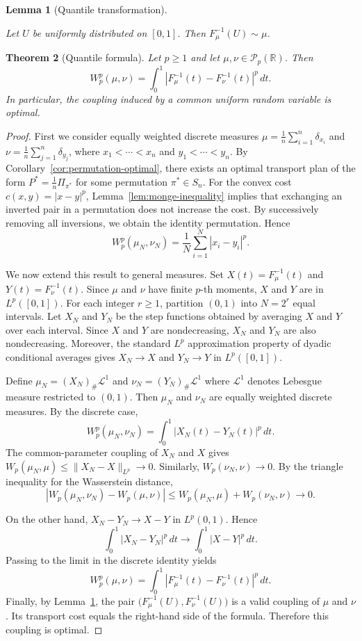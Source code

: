 \documentclass[11pt,a4paper]{article}
\newtheorem{theorem}{Theorem}[section]
\newtheorem{lemma}[theorem]{Lemma}
\theoremstyle{definition}
\begin{document}
\begin{lemma}[Quantile transformation]
    \label{lem:quantile-transform}

    Let $U$ be uniformly distributed on $[0,1]$. Then $F_\mu^{-1}(U)\sim\mu$.
\end{lemma}

\begin{theorem}[Quantile formula]
\label{thm:quantile-formula}
Let $p\geq1$ and let $\mu,\nu\in\mathcal{P}_p(\mathbb{R})$.
Then
\[
W_p^p(\mu,\nu)=\int_0^1\left|F_\mu^{-1}(t)-F_\nu^{-1}(t)\right|^p\,dt.
\]
In particular, the coupling induced by a common uniform random variable is optimal.
\end{theorem}

\begin{proof}
    First we consider equally weighted discrete measures $\mu=\frac{1}{n}\sum_{i=1}^n\delta_{x_i}$
    and $\nu=\frac{1}{n}\sum_{j=1}^n\delta_{y_j}$, where $x_1<\cdots<x_n$ and $y_1<\cdots<y_n$.
    By Corollary~\ref{cor:permutation-optimal}, there exists an optimal transport plan
    of the form $P^*=\frac{1}{n}\Pi_{\pi^*}$ for some permutation $\pi^*\in S_n$. For the
    convex cost $c(x,y)=|x-y|^p$, Lemma~\ref{lem:monge-inequality} implies that exchanging
    an inverted pair in a permutation does not increase the cost. By successively removing
    all inversions, we obtain the identity permutation. Hence
    \[W^p_p(\mu_N,\nu_N)=\frac{1}{N}\sum_{i=1}^N|x_i-y_i|^p.\]

    We now extend this result to general measures. Set $X(t)=F_\mu^{-1}(t)$ and $Y(t)=F_\nu^{-1}(t)$. Since
    $\mu$ and $\nu$ have finite $p$-th moments, $X$ and $Y$ are in $L^p([0,1])$. For each integer
    $r\geq1$, partition $(0,1)$ into $N=2^r$ equal intervals. Let $X_N$ and $Y_N$ be the step
    functions obtained by averaging $X$ and $Y$ over each interval. Since $X$ and $Y$ are nondecreasing,
    $X_N$ and $Y_N$ are also nondecreasing. Moreover, the standard $L^p$ approximation property of dyadic
    conditional averages gives $X_N\to X$ and $Y_N\to Y$ in $L^p([0,1])$.

    Define $\mu_N=(X_N)_\#\mathcal{L}^1$ and $\nu_N=(Y_N)_\#\mathcal{L}^1$ where $\mathcal{L}^1$ denotes
    Lebesgue measure restricted to $(0,1)$. Then $\mu_N$ and $\nu_N$ are equally weighted discrete measures.
    By the discrete case,
    \[W_p^p(\mu_N,\nu_N)=\int_0^1|X_N(t)-Y_N(t)|^p\,dt.\]
    The common-parameter coupling of $X_N$ and $X$ gives $W_p(\mu_N,\mu)\leq\|X_N-X\|_{L^p}\longrightarrow0$.
    Similarly, $W_p(\nu_N,\nu)\longrightarrow0$. By the triangle inequality for the Wasserstein distance,
    \[|W_p(\mu_N,\nu_N)-W_p(\mu,\nu)|\leq W_p(\mu_N,\mu)+W_p(\nu_N,\nu)\longrightarrow0.\]

    On the other hand,  $X_N-Y_N\to X-Y$ in $L^p(0,1)$. Hence
    \[
    \int_0^1|X_N-Y_N|^p\,dt
    \longrightarrow
    \int_0^1|X-Y|^p\,dt.
    \]
    Passing to the limit in the discrete identity yields
    \[
    W_p^p(\mu,\nu)=
    \int_0^1|F_\mu^{-1}(t)-F_\nu^{-1}(t)|^p\,dt.
    \]
    Finally, by Lemma~\ref{lem:quantile-transform}, the pair
    $\bigl(F_\mu^{-1}(U),F_\nu^{-1}(U)\bigr)$ is a valid coupling of $\mu$ and $\nu$.
    Its transport cost equals the right-hand side of the formula. Therefore this coupling is optimal.
\end{proof}
\end{document}
